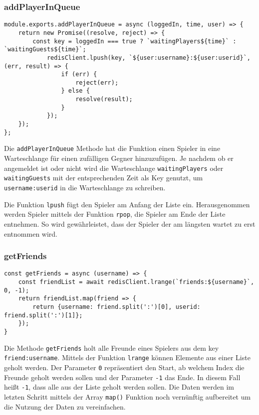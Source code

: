 \subsubsection{addPlayerInQueue}

\begin{lstlisting}[style=codeStyle, caption={Methode um einen Spieler in eine Warteschlange hinzuzufügen}, label={lst:addPlayerInQueue}]
module.exports.addPlayerInQueue = async (loggedIn, time, user) => {
    return new Promise((resolve, reject) => {
        const key = loggedIn === true ? `waitingPlayers${time}` : `waitingGuests${time}`;
            redisClient.lpush(key, `${user:username}:${user:userid}`, (err, result) => {
                if (err) {
                    reject(err);
                } else {
                    resolve(result);
                }
            });
    });
};
\end{lstlisting}

Die \verb|addPlayerInQueue| Methode hat die Funktion einen Spieler in eine Warteschlange für einen zufälligen Gegner hinzuzufügen. Je nachdem ob er angemeldet ist oder nicht wird die Warteschlange \verb|waitingPlayers| oder \verb|waitingGuests| mit der entsprechenden Zeit als Key genutzt, um \verb|username:userid| in die Warteschlange zu schreiben.

Die Funktion \verb|lpush| fügt den Spieler am Anfang der Liste ein. Herausgenommen werden Spieler mittels der Funktion \verb|rpop|, die Spieler am Ende der Liste entnehmen. So wird gewährleistet, dass der Spieler der am längsten wartet zu erst entnommen wird.


\subsubsection{getFriends}
\label{sec:getFriends}
\begin{lstlisting}[style=codeStyle, caption={Methode um Freunde eines Spielers zu erhalten}, label={lst:getFriends}]
const getFriends = async (username) => {
    const friendList = await redisClient.lrange(`friends:${username}`, 0, -1);
    return friendList.map(friend => {
        return {username: friend.split(':')[0], userid: friend.split(':')[1]};
    });
}
\end{lstlisting}

Die Methode \verb|getFriends| holt alle Freunde eines Spielers aus dem key \verb|friend:username|. Mittels der Funktion \verb|lrange| können Elemente aus einer Liste geholt werden. Der Parameter \verb|0| repräsentiert den Start, ab welchem Index die Freunde geholt werden sollen und der Parameter \verb|-1| das Ende. In diesem Fall heißt \verb|-1|, dass alle aus der Liste geholt werden sollen. Die Daten werden im letzten Schritt mittels der Array \verb|map()| Funktion noch vernünftig aufbereitet um die Nutzung der Daten zu vereinfachen.

